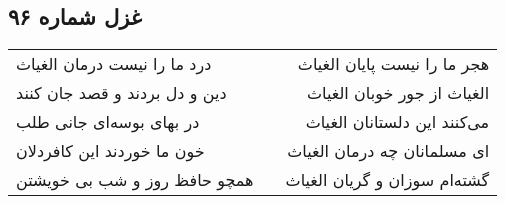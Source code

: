 \begin{center}
\section*{غزل شماره ۹۶}
\label{sec:sh096}
\begin{longtable}{l p{0.5cm} r}
درد ما را نیست درمان الغیاث
&&
هجر ما را نیست پایان الغیاث
\\
دین و دل بردند و قصد جان کنند
&&
الغیاث از جور خوبان الغیاث
\\
در بهای بوسه‌ای جانی طلب
&&
می‌کنند این دلستانان الغیاث
\\
خون ما خوردند این کافردلان
&&
ای مسلمانان چه درمان الغیاث
\\
همچو حافظ روز و شب بی خویشتن
&&
گشته‌ام سوزان و گریان الغیاث
\\
\end{longtable}
\end{center}
